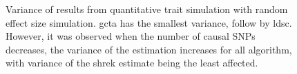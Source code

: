 \begin{figure}
{				
				\label{fig:ldscInQtRandVar}
			}
			\caption[Quantitative Trait with Random Effect Size Simulation Result(Variance)]
			{Variance of results from quantitative trait simulation with random effect size simulation.
				\gls{gcta} has the smallest variance, follow by \gls{ldsc}. 
				However, it was observed when the number of causal \glspl{SNP} decreases, the variance of the estimation increases for all algorithm, with variance of the \gls{shrek} estimate being the least affected.
			} 
			\label{fig:QtRandVar}
		\end{figure}
		
